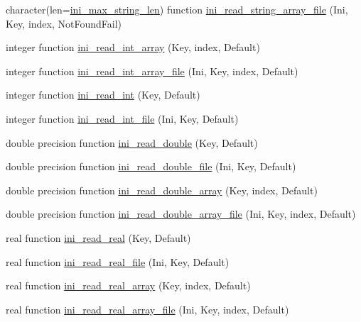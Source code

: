 \begin{DoxyCompactItemize}
\item 
character(len=\mbox{\hyperlink{namespaceinifile_a32faebf83b580d14b5af965dcb4eebfd}{ini\+\_\+max\+\_\+string\+\_\+len}}) function \mbox{\hyperlink{namespaceinifile_a99383bb07cc01af1876a178e4c55a8e5}{ini\+\_\+read\+\_\+string\+\_\+array\+\_\+file}} (Ini, Key, index, Not\+Found\+Fail)
\item 
integer function \mbox{\hyperlink{namespaceinifile_adc8c25cb1df4d91c2d6a7c06dbd55f25}{ini\+\_\+read\+\_\+int\+\_\+array}} (Key, index, Default)
\item 
integer function \mbox{\hyperlink{namespaceinifile_a327aeaeeb0b796b9b97cdae69147b0d6}{ini\+\_\+read\+\_\+int\+\_\+array\+\_\+file}} (Ini, Key, index, Default)
\item 
integer function \mbox{\hyperlink{namespaceinifile_a9e879031e39e829173144313b77f5ca7}{ini\+\_\+read\+\_\+int}} (Key, Default)
\item 
integer function \mbox{\hyperlink{namespaceinifile_a86f5e6c25d72652fcacf21732f33ea27}{ini\+\_\+read\+\_\+int\+\_\+file}} (Ini, Key, Default)
\item 
double precision function \mbox{\hyperlink{namespaceinifile_a208e4c210b698f22b9087879ca1ed83e}{ini\+\_\+read\+\_\+double}} (Key, Default)
\item 
double precision function \mbox{\hyperlink{namespaceinifile_aa190adb34f30ac9ceb261db1bff4e736}{ini\+\_\+read\+\_\+double\+\_\+file}} (Ini, Key, Default)
\item 
double precision function \mbox{\hyperlink{namespaceinifile_a0144764d1230507cd08723c17424daea}{ini\+\_\+read\+\_\+double\+\_\+array}} (Key, index, Default)
\item 
double precision function \mbox{\hyperlink{namespaceinifile_a0b015fcd4b5106643a5da8209d5d03d2}{ini\+\_\+read\+\_\+double\+\_\+array\+\_\+file}} (Ini, Key, index, Default)
\item 
real function \mbox{\hyperlink{namespaceinifile_aa8c7c6b2bd003b849faacce75951fd64}{ini\+\_\+read\+\_\+real}} (Key, Default)
\item 
real function \mbox{\hyperlink{namespaceinifile_a307d88edca7f1673a935f6c87c304019}{ini\+\_\+read\+\_\+real\+\_\+file}} (Ini, Key, Default)
\item 
real function \mbox{\hyperlink{namespaceinifile_a9cc4d7fee9f1ff784999850b4d6f0b87}{ini\+\_\+read\+\_\+real\+\_\+array}} (Key, index, Default)
\item 
real function \mbox{\hyperlink{namespaceinifile_aec5d85c08e9381bc15b4dd5f9250a228}{ini\+\_\+read\+\_\+real\+\_\+array\+\_\+file}} (Ini, Key, index, Default)

\end{DoxyCompactItemize}
